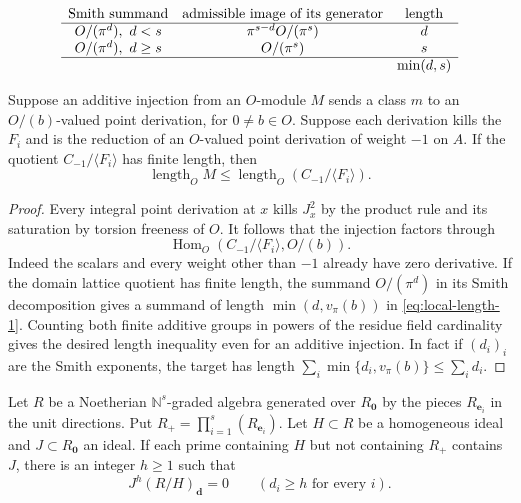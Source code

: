\begin{construction}
\[
\begin{array}{ccc}
\text{Smith summand}&\text{admissible image of its generator}&\text{length}\\ \hline
O/(\pi^d),\ d<s&\pi^{s-d}O/(\pi^s)&d\\
O/(\pi^d),\ d\ge s&O/(\pi^s)&s\\ \hline
&&\min(d,s)
\end{array}
\]
\caption{One Smith summand in the conormal bound, with \(s=v_\pi(b)\). A point derivation with values in \(O/(b)\) can see at most the smaller exponent.}\label{fig:cotangent-smith-factors}
\end{construction}

\begin{lemma}
\label{lem:torsion-derivations-conormal}
Suppose an additive
injection from an \(O\)-module \(M\) sends a class \(m\) to
an \(O/(b)\)-valued point derivation, for \(0\ne b\in O\).
Suppose each derivation kills the \(F_i\) and is the
reduction of an \(O\)-valued point derivation of weight
\(-1\) on \(A\). If the quotient
\(C_{-1}/\langle F_i\rangle\) has finite length, then
\[
 \operatorname{length}_O M\le
 \operatorname{length}_O(C_{-1}/\langle F_i\rangle).
\]
\end{lemma}

\begin{proof}
Every integral point derivation at \(x\)
kills \(J_x^2\) by the product rule and its saturation
by torsion freeness of \(O\). It follows that the injection
factors through
\[
             \operatorname{Hom}_O(C_{-1}/\langle F_i\rangle,O/(b)).
             \tag{1}\label{eq:local-length-1}
\]
Indeed the scalars and every weight other than \(-1\)
already have zero derivative. If the domain lattice
quotient has finite length, the summand \(O/(\pi^d)\)
in its Smith decomposition gives a summand of length
\(\min(d,v_\pi(b))\) in \eqref{eq:local-length-1}. Counting both finite additive
groups in powers of the residue field cardinality gives
the desired length inequality even for an additive
injection. In fact if \((d_i)_i\) are the Smith exponents,
the target has length
\(\sum_i\min\{d_i,v_\pi(b)\}\le\sum_i d_i\).
\end{proof}

\begin{auxlemma}\label{lem:rees-multidegree-annihilation}
Let \(R\) be a Noetherian \(\mathbb N^s\)-graded algebra generated over
\(R_{\boldsymbol0}\) by the pieces \(R_{\mathbf e_i}\) in the unit
directions. Put \(R_+=\prod_{i=1}^s (R_{\mathbf e_i})\).
Let \(H\subset R\) be a homogeneous ideal and \(J\subset R_{\boldsymbol0}\) an ideal.
If each prime containing \(H\) but not containing \(R_+\) contains \(J\),
there is an integer \(h\ge1\) such that
\[
 J^h(R/H)_{\mathbf d}=0\qquad(d_i\ge h\text{ for every }i).
\]
\end{auxlemma}

